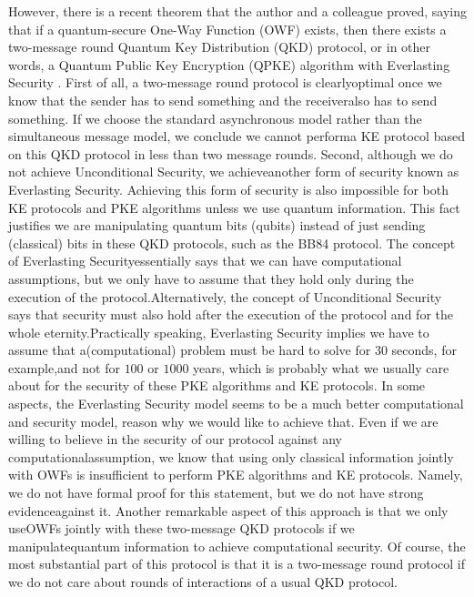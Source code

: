 \documentclass[12pt]{article}
\begin{document}
    However, there is a recent theorem that the author and a colleague proved, saying that if a quantum-secure One-Way Function (OWF) exists, then there exists a two-message round Quantum Key Distribution (QKD) protocol, or in other words, a Quantum Public Key Encryption (QPKE) algorithm with Everlasting Security \cite{malavolta-walter:robust-quantum-public-key-encryption-with-applications-to-quantum-key-distribution:2024:03-2024}. First of all, a two-message round protocol is clearly\break optimal once we know that the sender has to send something and the receiver\break also has to send something. If we choose the standard asynchronous model rather than the simultaneous message model, we conclude we cannot perform\break a KE protocol based on this QKD protocol in less than two message rounds. Second, although we do not achieve Unconditional Security, we achieve\break another form of security known as Everlasting Security. Achieving this form of security is also impossible for both KE protocols and PKE algorithms unless we use quantum information. This fact justifies we are manipulating quantum bits (qubits) instead of just sending (classical) bits in these QKD protocols, such as the BB84 protocol. The concept of Everlasting Security\break essentially says that we can have computational assumptions, but we only have to assume that they hold only during the execution of the protocol.\break Alternatively, the concept of Unconditional Security says that security must also hold after the execution of the protocol and for the whole eternity.\break Practically speaking, Everlasting Security implies we have to assume that a\break (computational) problem must be hard to solve for $30$ seconds, for example,\break and not for $100$ or $1000$ years, which is probably what we usually care about for the security of these PKE algorithms and KE protocols. In some aspects, the Everlasting Security model seems to be a much better computational and security model, reason why we would like to achieve that. Even if we are willing to believe in the security of our protocol against any computational\break assumption, we know that using only classical information jointly with OWFs is insufficient to perform PKE algorithms and KE protocols. Namely, we do not have formal proof for this statement, but we do not have strong evidence\break against it. Another remarkable aspect of this approach is that we only use\break OWFs jointly with these two-message QKD protocols if we manipulate\break quantum information to achieve computational security. Of course, the most substantial part of this protocol is that it is a two-message round protocol if we do not care about rounds of interactions of a usual QKD protocol.
\end{document}
